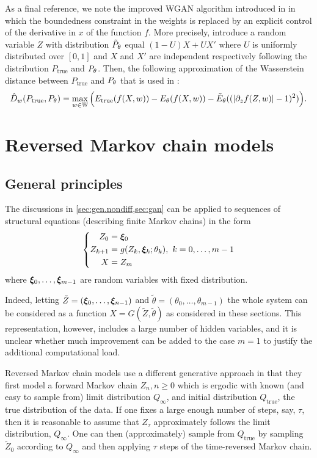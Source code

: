 As a final reference, we note the improved WGAN algorithm introduced in \citet{gulrajani2017improved} in which the boundedness constraint in the weights is replaced by an explicit control of the derivative in $x$ of the function $f$. More precisely, introduce a random variable $Z$ with distribution $\tilde P_\theta$ equal $(1-U) X + U X'$ where $U$ is uniformly distributed over $[0, 1]$ and $X$ and $X'$ are independent  respectively following the distribution $P_{\mathrm{true}}$ and $P_\theta$. Then, the following approximation of the Wasserstein distance between $P_{\mathrm{true}}$ and $P_\theta$  that is used in \citet{gulrajani2017improved}:
\[
\hat D_{w}(P_{\mathrm{true}},P_\theta)  = \max_{w\in \mathbb W} \Big(E_{\mathrm{true}}(f(X, w)) - E_{\theta}(f(X, w)) - \tilde E_\theta((|\partial_z f(Z, w)| - 1)^2) 
\Big).
\]

\section{Reversed Markov chain models}

\subsection{General principles}
The discussions in \cref{sec:gen.nondiff,sec:gan} can be applied to sequences of structural equations (describing finite Markov chains) in the form
\[
\left\{
\begin{aligned}
Z_0 &= {\bm{\xi}}_0\\
Z_{k+1} &= g(Z_k, {\bm{\xi}}_k; \theta_k), \ k=0, \ldots, m-1\\
X &= Z_m
\end{aligned}
\right.
\]
where ${\bm{\xi}}_0, \ldots, {\bm{\xi}}_{m-1}$ are random variables with fixed distribution.

Indeed, letting $\tilde Z = ({\bm{\xi}}_0, \ldots, {\bm{\xi}}_{n-1})$ and $\tilde \theta = (\theta_0, \ldots, \theta_{m-1})$ the whole system can be considered as a function $X = G(\tilde Z, \tilde{\theta})$ as considered in these sections. This representation, however, includes a large number of hidden variables, and it is unclear whether much improvement can be added to the case $m=1$ to justify the additional computational load. 

Reversed Markov chain models use a different generative approach in that they first model a forward Markov chain $Z_n, n\geq 0$ which is ergodic with known (and easy to sample from) limit distribution $Q_\infty$, and initial distribution $Q_{\mathrm{true}}$, the true distribution of the data. If one fixes  a large enough number of steps, say, $\tau$, then it is reasonable to assume that $Z_\tau$ approximately follows the limit distribution, $Q_\infty$. One can then (approximately) sample from $Q_{\mathrm{true}}$ by sampling $\tilde Z_0$ according to $Q_\infty$ and then applying $\tau$ steps of the time-reversed Markov chain.  

